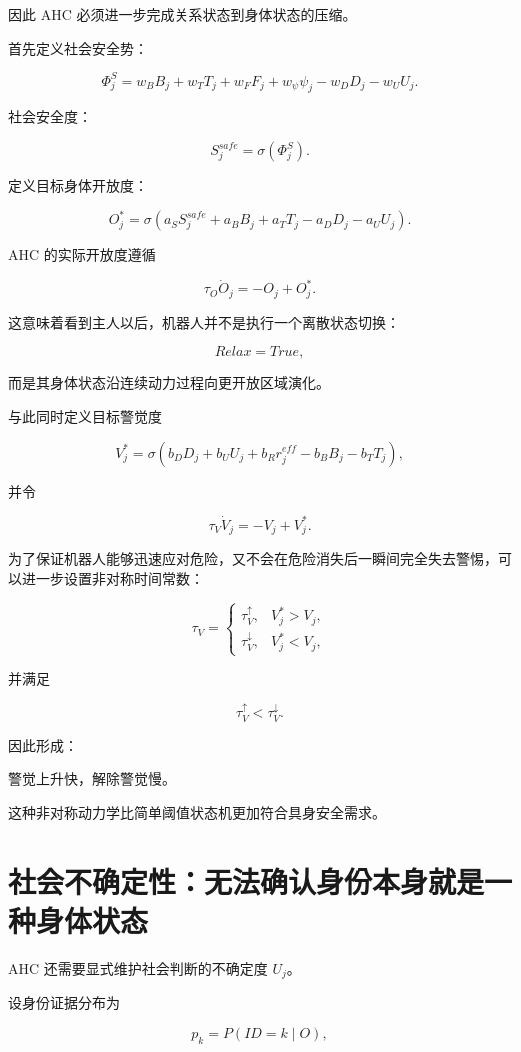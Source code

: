 因此 AHC 必须进一步完成关系状态到身体状态的压缩。

首先定义社会安全势：

\[
\Phi_j^S
=
w_BB_j
+
w_TT_j
+
w_FF_j
+
w_\psi\psi_j
-
w_DD_j
-
w_UU_j.
\]

社会安全度：

\[
S_j^{safe}
=
\sigma(\Phi_j^S).
\]

定义目标身体开放度：

\[
O_j^*
=
\sigma
\left(
a_SS_j^{safe}
+
a_BB_j
+
a_TT_j
-
a_DD_j
-
a_UU_j
\right).
\]

AHC 的实际开放度遵循

\[
\boxed{
\tau_O
\dot O_j
=
-O_j
+
O_j^*.
}
\]

这意味着看到主人以后，机器人并不是执行一个离散状态切换：

\[
Relax=True,
\]

而是其身体状态沿连续动力过程向更开放区域演化。

与此同时定义目标警觉度

\[
V_j^*
=
\sigma
\left(
b_DD_j
+
b_UU_j
+
b_Rr_j^{eff}
-
b_BB_j
-
b_TT_j
\right),
\]

并令

\[
\boxed{
\tau_V
\dot V_j
=
-V_j
+
V_j^*.
}
\]

为了保证机器人能够迅速应对危险，又不会在危险消失后一瞬间完全失去警惕，可以进一步设置非对称时间常数：

\[
\tau_V=
\begin{cases}
\tau_V^\uparrow,
&
V_j^*>V_j,
\\
\tau_V^\downarrow,
&
V_j^*<V_j,
\end{cases}
\]

并满足

\[
\tau_V^\uparrow
<
\tau_V^\downarrow.
\]

因此形成：

\begin{statementbox}
警觉上升快，解除警觉慢。
\end{statementbox}

这种非对称动力学比简单阈值状态机更加符合具身安全需求。


\section{社会不确定性：无法确认身份本身就是一种身体状态}

AHC 还需要显式维护社会判断的不确定度 $U_j$。

设身份证据分布为

\[
p_k=P(ID=k\mid O),
\]

